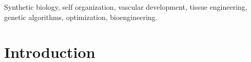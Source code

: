 \documentclass[conference, 12pt]{IEEEtran}
\begin{document}







\maketitle
\thispagestyle{plain}

\begin{abstract}

\end{abstract}



\renewcommand\IEEEkeywordsname{Key Words}
\begin{IEEEkeywords}
Synthetic biology, self organization, vascular development, tissue engineering, genetic algorithms, optimization, bioengineering.
\end{IEEEkeywords}

%

\section{Introduction}
\end{document}

